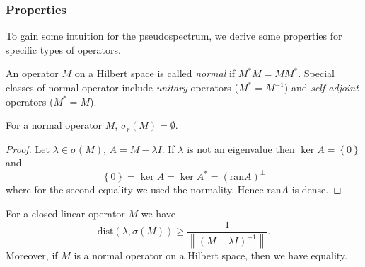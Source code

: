\subsubsection{Properties}

To gain some intuition for the pseudospectrum, we derive some properties for specific 
types of operators. 

\begin{definition}
    An operator $M$ on a Hilbert space is called \emph{normal} if $M^* M = M M^*$. 
    Special classes of normal operator include \emph{unitary} operators ($M^* = M^{-1}$) 
    and \emph{self-adjoint} operators ($M^* = M$). 
\end{definition}

\begin{proposition}
    For a normal operator $M$, $\sigma_r (M) = \emptyset$. 
\end{proposition}

\begin{proof}
    Let $\lambda \in \sigma (M)$, $A = M - \lambda I$. If $\lambda$ is not an eigenvalue 
    then $\ker A = \left\{ 0 \right\}$ and 
    \begin{equation}
        \left\{ 0 \right\} = \ker A = \ker A^* = (\text{ran} A)^\perp
    \end{equation}
    where for the second equality we used the normality. Hence $\text{ran} A$ 
    is dense. 
\end{proof}

\begin{lemma}
    \label{lem:resolvent_dist}
    For a closed linear operator $M$ we have
    \begin{equation}
        \label{eq:resolvent_dist}
        \text{dist} (\lambda, \sigma (M)) \geq \frac{1}{
            \left\| (M - \lambda I)^{-1} \right\|} . 
    \end{equation}
    Moreover, if $M$ is a normal operator on a Hilbert space, then we have equality. 
\end{lemma}

